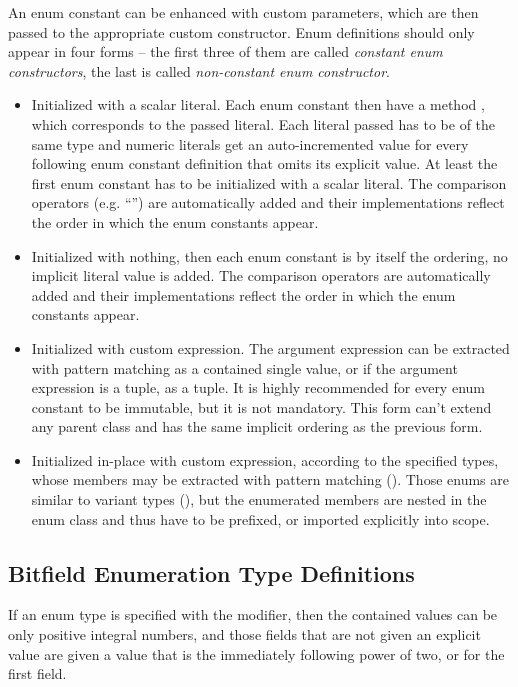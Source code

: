 An enum constant can be enhanced with custom parameters, which are then passed to the appropriate custom constructor. Enum definitions should only appear in four forms -- the first three of them are called {\em constant enum constructors}, the last is called {\em non-constant enum constructor}. 
\begin{itemize}
  \item Initialized with a scalar literal. Each enum constant then have a method , which corresponds to the passed literal. Each literal passed has to be of the same type and numeric literals get an auto-incremented value for every following enum constant definition that omits its explicit value. At least the first enum constant has to be initialized with a scalar literal. The comparison operators (e.g. ``\code{<}'') are automatically added and their implementations reflect the order in which the enum constants appear.
  \item Initialized with nothing, then each enum constant is by itself the ordering, no implicit literal value is added. The comparison operators are automatically added and their implementations reflect the order in which the enum constants appear. 
  \item Initialized with custom expression. The argument expression can be extracted with pattern matching as a contained single value, or if the argument expression is a tuple, as a tuple. It is highly recommended for every enum constant to be immutable, but it is not mandatory. This form can't extend any parent class and has the same implicit ordering as the previous form. 
  \item Initialized in-place with custom expression, according to the specified types, whose members may be extracted with pattern matching (). Those enums are similar to variant types (), but the enumerated members are nested in the enum class and thus have to be prefixed, or imported explicitly into scope. 
\end{itemize}





\subsection{Bitfield Enumeration Type Definitions}

If an enum type is specified with the  modifier, then the contained values can be only positive integral numbers, and those fields that are not given an explicit value are given a value that is the immediately following power of two, or  for the first field. 





